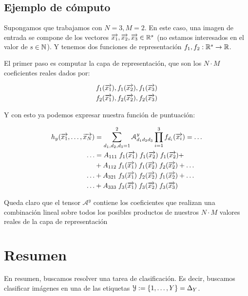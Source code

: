 \subsection{Ejemplo de cómputo} \label{ejemplo:funcion_puntuacion}

Supongamos que trabajamos con $N = 3, M = 2$. En este caso, una imagen de entrada se compone de los vectores $\overrightarrow{x_1}, \overrightarrow{x_2}, \overrightarrow{x_3} \in \mathbb{R}^s$ (no estamos interesados en el valor de $s \in \mathbb{N}$). Y tenemos dos funciones de representación $f_1, f_2: \mathbb{R}^s \to \mathbb{R}$.

El primer paso es computar la capa de representación, que son los $N \cdot M$ coeficientes reales dados por:

\begin{equation}
\begin{split}
    f_1(\overrightarrow{x_1}), f_1(\overrightarrow{x_2}), f_1(\overrightarrow{x_3}) \\
    f_2(\overrightarrow{x_1}), f_2(\overrightarrow{x_2}), f_2(\overrightarrow{x_3})
\end{split}
\end{equation}

Y con esto ya podemos expresar nuestra función de puntuación:

\begin{equation}
\begin{split}
    h_y(\overrightarrow{x_1}, \ldots, \overrightarrow{x_N}) &= \sum_{d_1, d_2, d_3 = 1}^{2} \mathcal{A}^y_{d_1 d_2 d_3} \prod_{i = 1}^3 f_{d_i}(\overrightarrow{x_i}) = \ldots \\
    \ldots &= A_{111} \; f_1(\overrightarrow{x_1}) \; f_1(\overrightarrow{x_2}) \; f_1(\overrightarrow{x_2}) + \\
           &+ A_{112} \; f_1(\overrightarrow{x_1}) \; f_1(\overrightarrow{x_2}) \; f_2(\overrightarrow{x_2}) + \ldots \\
           \ldots &+ A_{321} \; f_3(\overrightarrow{x_1}) \; f_2(\overrightarrow{x_2}) \; f_1(\overrightarrow{x_2}) + \ldots \\
           \ldots &+ A_{333} \; f_3(\overrightarrow{x_1}) \; f_3(\overrightarrow{x_2}) \; f_3(\overrightarrow{x_3})
\end{split}
\end{equation}

Queda claro que el tensor $\mathcal{A}^y$ contiene los coeficientes que realizan una combinación lineal sobre todos los posibles productos de nuestros $N \cdot M$ valores reales de la capa de representación

\section{Resumen}

En resumen, buscamos resolver una tarea de clasificación. Es decir, buscamos clasificar imágenes en una de las etiquetas $\mathcal{Y} := \{1, \ldots, Y\} = \Delta_{Y}$.

